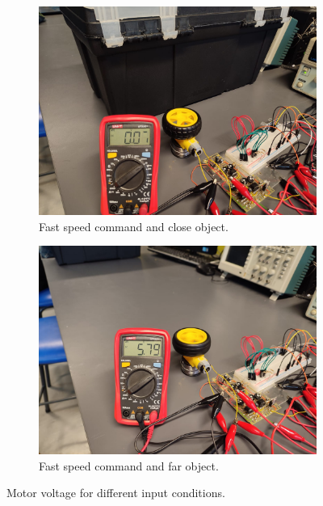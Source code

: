 \begin{figure}[H]
\begin{subfigure}[]{0.4\textwidth}
\end{subfigure}
\begin{subfigure}[]{0.4\textwidth}
\includegraphics[width=\linewidth]{./Figures/Mtr_Ctrl_Fast_Close.jpeg}
\caption{Fast speed command and close object.}
\label{subfig:mtrctrl_prac_fc}	
\end{subfigure}
\hfill
\begin{subfigure}[]{0.4\textwidth}
\includegraphics[width=\linewidth]{./Figures/Mtr_Ctrl_Fast_Far.jpeg}
\caption{Fast speed command and far object.} 			
\label{subfig:mtrctrl_prac_ff}	
\end{subfigure}
\caption{Motor voltage for different input conditions.}
\label{fig:mtrctrl_prac}
\end{figure}



